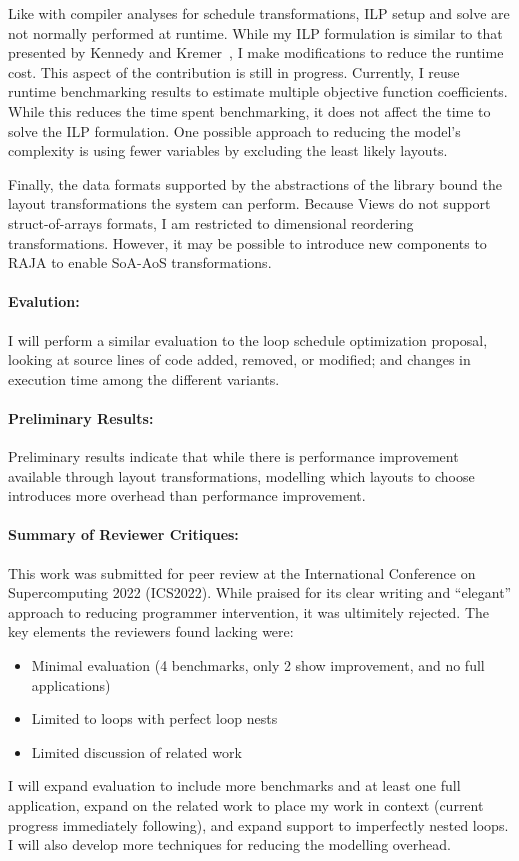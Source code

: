 \documentclass{article}
\begin{document}
Like with compiler analyses for schedule transformations, ILP setup and solve are not normally performed at runtime. 
While my ILP formulation is similar to that presented by Kennedy and Kremer~\cite{kennedy1998automatic}, I make modifications to reduce the runtime cost.
This aspect of the contribution is still in progress.
Currently, I reuse runtime benchmarking results to estimate multiple objective function coefficients.
While this reduces the time spent benchmarking, it does not affect the time to solve the ILP formulation.
One possible approach to reducing the model's complexity is using fewer variables by excluding the least likely layouts.


Finally, the data formats supported by the abstractions of the library bound the layout transformations the system can perform.
Because Views do not support struct-of-arrays formats, I am restricted to dimensional reordering transformations.
However, it may be possible to introduce new components to RAJA to enable SoA-AoS transformations.

\paragraph{Evalution:}

I will perform a similar evaluation to the loop schedule optimization proposal, looking at source lines of code added, removed, or modified; and changes in execution time among the different variants.


\paragraph{Preliminary Results:}

Preliminary results indicate that while there is performance improvement available through layout transformations, modelling which layouts to choose introduces more overhead than performance improvement. 


\paragraph{Summary of Reviewer Critiques:}

This work was submitted for peer review at the International Conference on Supercomputing 2022 (ICS2022). 
While praised for its clear writing and \enquote{elegant} approach to reducing programmer intervention, it was ultimitely rejected.
The key elements the reviewers found lacking were:
\begin{itemize}
\item Minimal evaluation (4 benchmarks, only 2 show improvement, and no full applications)
\item Limited to loops with perfect loop nests
\item Limited discussion of related work
\end{itemize}
I will expand evaluation to include more benchmarks and at least one full application, expand on the related work to place my work in context (current progress immediately following), and expand support to imperfectly nested loops. I will also develop more techniques for reducing the modelling overhead.
\end{document}

